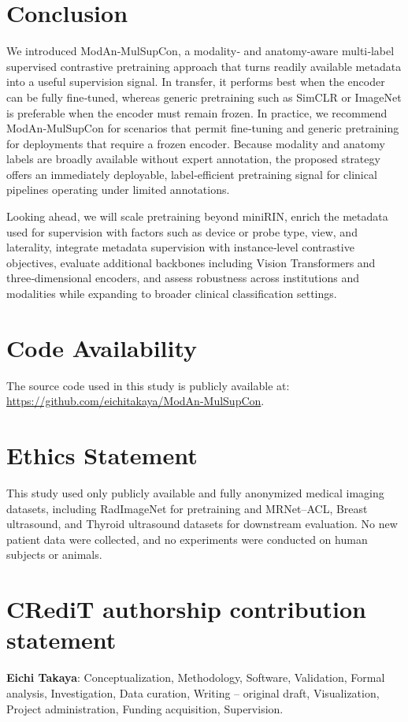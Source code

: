 \documentclass[final,1p,times]{elsarticle}
\begin{document}
\section{Conclusion}
We introduced ModAn‑MulSupCon, a modality‑ and anatomy‑aware multi‑label supervised contrastive pretraining approach that turns readily available metadata into a useful supervision signal. In transfer, it performs best when the encoder can be fully fine‑tuned, whereas generic pretraining such as SimCLR or ImageNet is preferable when the encoder must remain frozen. In practice, we recommend ModAn‑MulSupCon for scenarios that permit fine‑tuning and generic pretraining for deployments that require a frozen encoder.
Because modality and anatomy labels are broadly available without expert annotation, the proposed strategy offers an immediately deployable, label‑efficient pretraining signal for clinical pipelines operating under limited annotations.

Looking ahead, we will scale pretraining beyond miniRIN, enrich the metadata used for supervision with factors such as device or probe type, view, and laterality, integrate metadata supervision with instance‑level contrastive objectives, evaluate additional backbones including Vision Transformers and three‑dimensional encoders, and assess robustness across institutions and modalities while expanding to broader clinical classification settings.

\section*{Code Availability}
The source code used in this study is publicly available at: \url{https://github.com/eichitakaya/ModAn-MulSupCon}.
\newpage
\section*{Ethics Statement}
This study used only publicly available and fully anonymized medical imaging datasets, including RadImageNet for pretraining and MRNet--ACL, Breast ultrasound, and Thyroid ultrasound datasets for downstream evaluation. No new patient data were collected, and no experiments were conducted on human subjects or animals.
\newpage
\section*{CRediT authorship contribution statement}
\textbf{Eichi Takaya}: Conceptualization, Methodology, Software, Validation, Formal analysis, Investigation, Data curation, Writing -- original draft, Visualization, Project administration, Funding acquisition, Supervision.\\
\end{document}
